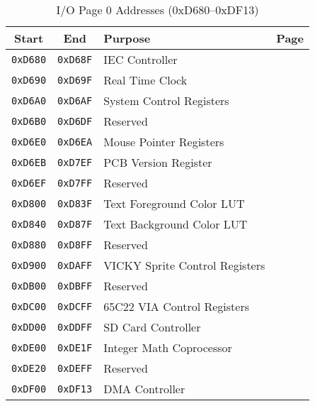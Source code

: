 \begin{table}[ht]
    \begin{center}
        \begin{tabular}{|c|c|l|l|} \hline
            Start & End & Purpose & Page \\ \hline \hline
            \verb+0xD680+ & \verb+0xD68F+ & IEC Controller & \pageref{tab:via_reg} \\ \hline
            \verb+0xD690+ & \verb+0xD69F+ & Real Time Clock & \pageref{tab:rtc_registers} \\ \hline
            \verb+0xD6A0+ & \verb+0xD6AF+ & System Control Registers & \pageref{sec:sysctrl} \\ \hline
            \verb+0xD6B0+ & \verb+0xD6DF+ & Reserved & \\ \hline
            \verb+0xD6E0+ & \verb+0xD6EA+ & Mouse Pointer Registers & \pageref{tab:mouse_reg} \\ \hline
            \verb+0xD6EB+ & \verb+0xD7EF+ & PCB Version Register & \pageref{tab:machine_id_ver} \\ \hline
            \verb+0xD6EF+ & \verb+0xD7FF+ & Reserved & \\ \hline
            \verb+0xD800+ & \verb+0xD83F+ & Text Foreground Color LUT & \multirow{2}{*}{\pageref{tab:text_luts}} \\ \cline{1-3}
            \verb+0xD840+ & \verb+0xD87F+ & Text Background Color LUT & \\ \hline
            \verb+0xD880+ & \verb+0xD8FF+ & Reserved & \\ \hline
            \verb+0xD900+ & \verb+0xDAFF+ & VICKY Sprite Control Registers & \pageref{tab:sp_reg} \\ \hline
            \verb+0xDB00+ & \verb+0xDBFF+ & Reserved & \\ \hline
            \verb+0xDC00+ & \verb+0xDCFF+ & 65C22 VIA Control Registers & \pageref{tab:via_reg}\\ \hline
            \verb+0xDD00+ & \verb+0xDDFF+ & SD Card Controller & \pageref{tab:ps2_reg} \\ \hline
            \verb+0xDE00+ & \verb+0xDE1F+ & Integer Math Coprocessor & \pageref{sec:int_math_copro} \\ \hline
            \verb+0xDE20+ & \verb+0xDEFF+ & Reserved & \\ \hline
            \verb+0xDF00+ & \verb+0xDF13+ & DMA Controller & \pageref{tab:dma_reg} \\ \hline
        \end{tabular}
        \caption{I/O Page 0 Addresses (0xD680--0xDF13)}
        \label{tab:io_page_0_1}
    \end{center}
\end{table}